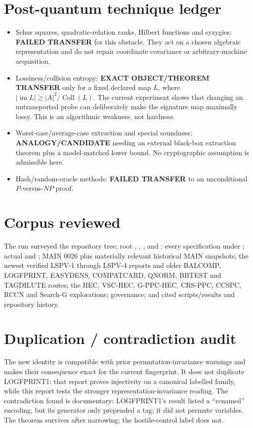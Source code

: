 \documentclass[11pt]{article}
\begin{document}
\section{Post-quantum technique ledger}

\begin{itemize}
\item Schur squares, quadratic-relation ranks, Hilbert functions and syzygies:
\textbf{FAILED TRANSFER} for this obstacle.  They act on a chosen algebraic
representation and do not repair coordinate covariance or arbitrary-machine acquisition.
\item Lossiness/collision entropy: \textbf{EXACT OBJECT/THEOREM TRANSFER} only for a
fixed declared map $L$, where $|\operatorname{im}L|\ge |A|^2/\operatorname{Coll}(L)$.
The current experiment shows that changing an untransported probe can deliberately make
the signature map maximally lossy.  This is an algorithmic weakness, not hardness.
\item Worst-case/average-case extraction and special soundness:
\textbf{ANALOGY/CANDIDATE} needing an external black-box extraction theorem plus a
model-matched lower bound.  No cryptographic assumption is admissible here.
\item Hash/random-oracle methods: \textbf{FAILED TRANSFER} to an unconditional
$P$-versus-$NP$ proof.
\end{itemize}

\section{Corpus reviewed}

The run surveyed the repository tree; root , ,
, and ; every specification under
; actual  and ; MAIN 0026 plus materially
relevant historical MAIN snapshots; the newest verified LSPV-1 through LSPV-4 reports
and older BALCOMP, LOGFPRINT, EASYDENS, COMPATCARD, QNORM, BBTEST and TAGDILUTE routes;
the HEC, VSC-HEC, G-PPC-HEC, CRS-PPC, CCSPC, RCCN and Search-G explorations; governance;
and cited scripts/results and repository history.

\section{Duplication / contradiction audit}

The new identity is compatible with prior permutation-invariance warnings and makes their
consequence exact for the current fingerprint.  It does not duplicate LOGFPRINT1: that
report proves injectivity on a canonical labelled family, while this report tests the
stronger representation-invariance reading.  The contradiction found is documentary:
LOGFPRINT1's result listed a ``renamed'' encoding, but its generator only prepended a tag;
it did not permute variables.  The theorem survives after narrowing; the hostile-control
label does not.
\end{document}
